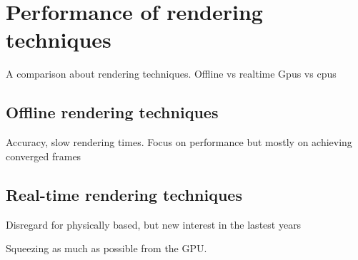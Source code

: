 \section{Performance of rendering techniques} 

A comparison about rendering techniques. Offline vs realtime
Gpus vs cpus


\subsection{Offline rendering techniques}
Accuracy, slow rendering times. Focus on performance but mostly on achieving converged frames

\subsection{Real-time rendering techniques}
Disregard for physically based, but new interest in the lastest years

Squeezing as much as possible from the GPU. 



